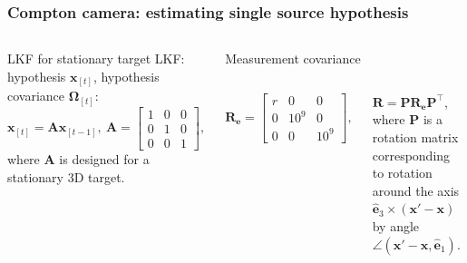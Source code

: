 \documentclass[aspectratio=169]{beamer}
\newcommand{\m}[1]{\ensuremath{\mathbf{#1}}}
\begin{document}


\begin{frame}[noframenumbering]
\frametitle{Compton camera: estimating single source hypothesis}

\begin{columns}[c]

\begin{block}{LKF for stationary target}
LKF: hypothesis $\mathbf{x}_{[t]}$, hypothesis covariance $\mathbf{\Omega}_{[t]}$: $$\mathbf{x}_{[t]} = \m{A}\mathbf{x}_{[t-1]},~\mathbf{A} = \left[\begin{smallmatrix}
  1 & 0 & 0\\
  0 & 1 & 0\\
  0 & 0 & 1
\end{smallmatrix}\right],
\label{eq:lti_model}$$
where $\mathbf{A}$ is designed for a stationary 3D target.
\end{block}


\begin{block}{Measurement covariance}

  \begin{columns}[c]


  $$\mathbf{R_e} = \left[\begin{smallmatrix}
    r & 0 & 0 \\
    0 & 10^9 & 0 \\
    0 & 0 & 10^9
  \end{smallmatrix}\right],$$

  \vfill


  $\mathbf{R} = \mathbf{P}\mathbf{R_e}\mathbf{P}^{\intercal}$, where $\mathbf{P}$ is a rotation matrix corresponding to rotation around the axis $\mathbf{\hat{e}}_3 \times \left(\mathbf{x}' - \mathbf{x}\right)$ by angle $\angle \left(\mathbf{x}' - \mathbf{x}, \mathbf{\hat{e}}_1\right)$.

  \end{columns}

\end{block}

\end{columns}

\end{frame}
\end{document}
